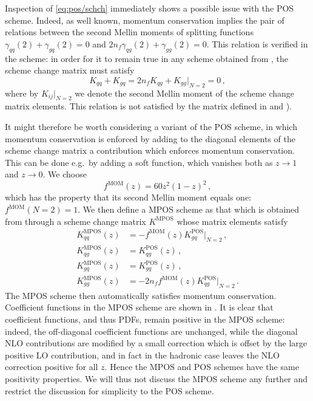 Inspection of \cref{eq:pos/schch} immediately shows a possible issue
with the POS scheme. Indeed, as well known, momentum conservation
implies the pair of relations between the second Mellin moments of splitting
functions $\gamma_{qq}(2)+\gamma_{gq}(2)=0$ and
 $2n_f\gamma_{qg}(2)+\gamma_{gg}(2)=0$. This relation is verified in the
\msbar{} scheme:  in order for it to remain true  in any scheme obtained
from \msbar{}, the scheme change matrix must satisfy
\begin{equation}\label{eq:pos/momcons}
  K_{qq}+K_{gq}=2n_fK_{qg}+K_{gg}\Big|_{N=2}=0 \,,
\end{equation}
where by $K_{ij}\Big|_{N=2}$ we denote the second Mellin moment of the
scheme change matrix elements. This relation is not satisfied by the matrix
defined in  and
).

It might therefore be worth considering a variant of the POS scheme,
in which momentum conservation is enforced by adding to the diagonal
elements of the scheme change matrix a contribution which enforces
momentum conservation. This can be done e.g.\ by adding a soft
function, which vanishes both as $z\to1$ and $z \to0$. We choose
\begin{equation}\label{eq:pos/fmom}
  f^{\textrm{MOM}}(z)= 60 z^2(1-z)^2\,,
\end{equation}
which has the property that its second Mellin moment equals one:
$f^{\textrm{MOM}}(N=2)=1$. We then define a MPOS scheme as that which is obtained
from \msbar{} through a scheme change matrix $K^{\textrm{MPOS}}$ whose
matrix elements satisfy
\begin{align}
  \label{eq:pos/mposqq}
  K^{\textrm{MPOS}}_{qq}(z)&= - f^{\textrm{MOM}}(z) K^{\textrm{POS}}_{gq}\Big|_{N=2} \,,\\
  \label{eq:pos/mposqg}
  K^{\textrm{MPOS}}_{qg}(z)&= K^{\textrm{POS}}_{qg}(z) \,,\\
  \label{eq:pos/mposgq}
  K^{\textrm{MPOS}}_{gq}(z)&= K^{\textrm{POS}}_{gq}(z) \,,\\
  \label{eq:pos/mposgg}
  K^{\textrm{MPOS}}_{gg}(z)&= -2n_f f^{\textrm{MOM}}(z) K^{\textrm{POS}}_{qg}\Big|_{N=2} \,.
\end{align}
The MPOS scheme then automatically satisfies momentum conservation. Coefficient
functions in the MPOS scheme are shown in . 
It is clear that coefficient functions, and thus PDFs, remain positive in the
MPOS scheme: indeed, the off-diagonal coefficient functions are unchanged,
while the diagonal NLO contributions are modified by a small correction which
is offset by the large positive LO contribution, and in fact in the hadronic
case leaves the NLO correction positive for all $z$.
Hence the MPOS and POS schemes have the same positivity properties. 
We will thus not discuss the MPOS scheme any further and restrict the
discussion for simplicity to the POS scheme.

